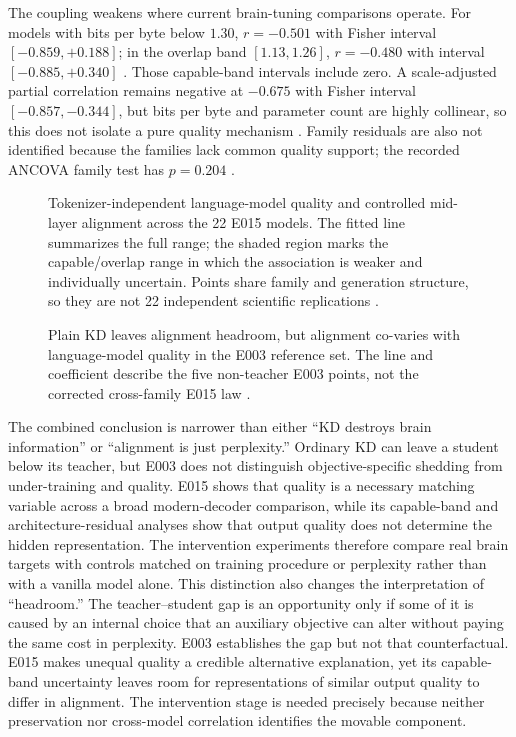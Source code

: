 The coupling weakens where current brain-tuning comparisons operate.
For models with bits per byte below $1.30$, $r=-0.501$ with Fisher interval $[-0.859,+0.188]$; in the overlap band $[1.13,1.26]$, $r=-0.480$ with interval $[-0.885,+0.340]$ .
Those capable-band intervals include zero.
A scale-adjusted partial correlation remains negative at $-0.675$ with Fisher interval $[-0.857,-0.344]$, but bits per byte and parameter count are highly collinear, so this does not isolate a pure quality mechanism .
Family residuals are also not identified because the families lack common quality support; the recorded ANCOVA family test has $p=0.204$ .

\begin{figure}[t]
  \centering
  \caption{Tokenizer-independent language-model quality and controlled mid-layer alignment across the 22 E015 models. The fitted line summarizes the full range; the shaded region marks the capable/overlap range in which the association is weaker and individually uncertain. Points share family and generation structure, so they are not 22 independent scientific replications .}
  \label{fig:quality-alignment}
\end{figure}

\begin{figure}[t]
  \centering
  \resizebox{0.98\textwidth}{!}{}
  \caption{Plain KD leaves alignment headroom, but alignment co-varies with language-model quality in the E003 reference set. The line and coefficient describe the five non-teacher E003 points, not the corrected cross-family E015 law .}
  \label{fig:kd}
\end{figure}

The combined conclusion is narrower than either ``KD destroys brain information'' or ``alignment is just perplexity.''
Ordinary KD can leave a student below its teacher, but E003 does not distinguish objective-specific shedding from under-training and quality.
E015 shows that quality is a necessary matching variable across a broad modern-decoder comparison, while its capable-band and architecture-residual analyses show that output quality does not determine the hidden representation.
The intervention experiments therefore compare real brain targets with controls matched on training procedure or perplexity rather than with a vanilla model alone.
This distinction also changes the interpretation of ``headroom.''
The teacher--student gap is an opportunity only if some of it is caused by an internal choice that an auxiliary objective can alter without paying the same cost in perplexity.
E003 establishes the gap but not that counterfactual.
E015 makes unequal quality a credible alternative explanation, yet its capable-band uncertainty leaves room for representations of similar output quality to differ in alignment.
The intervention stage is needed precisely because neither preservation nor cross-model correlation identifies the movable component.

